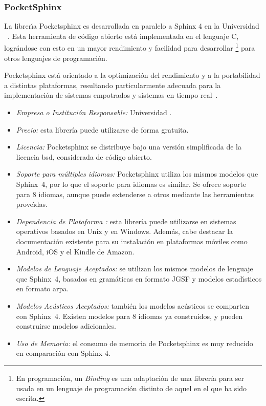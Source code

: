 \subsubsection{PocketSphinx}
\label{sec:pocketsphinx}

La librer{\'\i}a Pocketsphinx es desarrollada en paralelo a Sphinx 4 en la Universidad
\mbox{ \cite{PocketSphinxHomePage}}. Esta herramienta de c\'odigo abierto
est\'a implementada en el lenguaje C, logr\'andose con esto en un mayor rendimiento y facilidad
para desarrollar \footnote{En programaci\'on, un \emph{Binding} es una adaptaci\'on de una librer\'ia para ser usada en un 
lenguaje de programaci\'on distinto de aquel en el que ha sido escrita.} 
para otros lenguajes de programaci\'on.

Pocketsphinx est\'a orientado a la optimizaci\'on del rendimiento y a la portabilidad a distintas
plataformas, resultando particularmente adecuada para la implementaci\'on de sistemas empotrados
y sistemas en tiempo \mbox{real \cite{HugginsDainesPocketSphinx2006}}.

\begin{itemize}
	\item \emph{Empresa o Instituci\'on Responsable:} Universidad .
	\item \emph{Precio:} esta librer\'ia puede utilizarse de forma gratuita.
	\item \emph{Licencia:} Pocketsphinx  se distribuye bajo una versi\'on simplificada de la licencia
	\gls{bsd}, considerada de c\'odigo abierto.
	\item \emph{Soporte para m\'ultiples idiomas:} Pocketsphinx utiliza los mismos modelos
	que \mbox{Sphinx 4}, por lo que el soporte para idiomas es similar. Se ofrece soporte para 8
	idiomas, aunque puede extenderse a otros mediante las herramientas prove{\'\i}das.
	\item \emph{Dependencia de Plataforma :} esta librer\'ia puede utilizarse en sistemas operativos
	basados en Unix y en Windows. Adem\'as, cabe destacar la documentaci\'on existente para su instalaci\'on
	en plataformas m\'oviles como Android, iOS y el Kindle de Amazon.
	\item \emph{Modelos de Lenguaje Aceptados:} se utilizan los mismos modelos de lenguaje que \mbox{Sphinx 4},
	basados en gram\'aticas en formato JGSF y modelos estad{\'\i}sticos en formato \gls{arpa}.
	\item \emph{Modelos Ac\'usticos Aceptados:} tambi\'en los modelos ac\'usticos se comparten con \mbox{Sphinx 4}.
	Existen modelos para 8 idiomas ya construidos, y pueden construirse modelos adicionales.
	\item \emph{Uso de Memoria:} el consumo de memoria de Pocketsphinx es muy reducido en comparaci\'on con
        Sphinx 4\cite{SphinxVersions}.
\end{itemize}